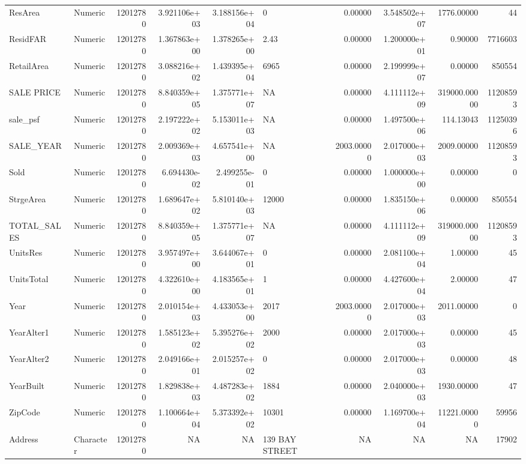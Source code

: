\documentclass[12pt,]{article}
\begin{document}
\begin{table}
{\begin{tabular}[t]{llrrrlrrrr}
ResArea & Numeric & 12012780 & 3.921106e+03 & 3.188156e+04 & 0 & 0.00000 & 3.548502e+07 & 1776.00000 & 44\\
ResidFAR & Numeric & 12012780 & 1.367863e+00 & 1.378265e+00 & 2.43 & 0.00000 & 1.200000e+01 & 0.90000 & 7716603\\
RetailArea & Numeric & 12012780 & 3.088216e+02 & 1.439395e+04 & 6965 & 0.00000 & 2.199999e+07 & 0.00000 & 850554\\
\addlinespace
SALE PRICE & Numeric & 12012780 & 8.840359e+05 & 1.375771e+07 & NA & 0.00000 & 4.111112e+09 & 319000.00000 & 11208593\\
sale\_psf & Numeric & 12012780 & 2.197222e+02 & 5.153011e+03 & NA & 0.00000 & 1.497500e+06 & 114.13043 & 11250396\\
SALE\_YEAR & Numeric & 12012780 & 2.009369e+03 & 4.657541e+00 & NA & 2003.00000 & 2.017000e+03 & 2009.00000 & 11208593\\
Sold & Numeric & 12012780 & 6.694430e-02 & 2.499255e-01 & 0 & 0.00000 & 1.000000e+00 & 0.00000 & 0\\
StrgeArea & Numeric & 12012780 & 1.689647e+02 & 5.810140e+03 & 12000 & 0.00000 & 1.835150e+06 & 0.00000 & 850554\\
\addlinespace
TOTAL\_SALES & Numeric & 12012780 & 8.840359e+05 & 1.375771e+07 & NA & 0.00000 & 4.111112e+09 & 319000.00000 & 11208593\\
UnitsRes & Numeric & 12012780 & 3.957497e+00 & 3.644067e+01 & 0 & 0.00000 & 2.081100e+04 & 1.00000 & 45\\
UnitsTotal & Numeric & 12012780 & 4.322610e+00 & 4.183565e+01 & 1 & 0.00000 & 4.427600e+04 & 2.00000 & 47\\
Year & Numeric & 12012780 & 2.010154e+03 & 4.433053e+00 & 2017 & 2003.00000 & 2.017000e+03 & 2011.00000 & 0\\
YearAlter1 & Numeric & 12012780 & 1.585123e+02 & 5.395276e+02 & 2000 & 0.00000 & 2.017000e+03 & 0.00000 & 45\\
\addlinespace
YearAlter2 & Numeric & 12012780 & 2.049166e+01 & 2.015257e+02 & 0 & 0.00000 & 2.017000e+03 & 0.00000 & 48\\
YearBuilt & Numeric & 12012780 & 1.829838e+03 & 4.487283e+02 & 1884 & 0.00000 & 2.040000e+03 & 1930.00000 & 47\\
ZipCode & Numeric & 12012780 & 1.100664e+04 & 5.373392e+02 & 10301 & 0.00000 & 1.169700e+04 & 11221.00000 & 59956\\
Address & Character & 12012780 & NA & NA & 139 BAY STREET & NA & NA & NA & 17902\\

\end{tabular}}
\end{table}
\end{document}
